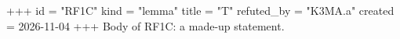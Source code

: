 +++
id = "RF1C"
kind = "lemma"
title = "T"
refuted_by = "K3MA.a"
created = 2026-11-04
+++
Body of RF1C: a made-up statement.
